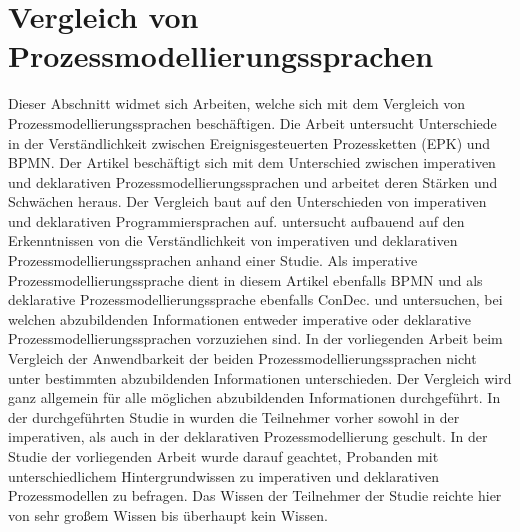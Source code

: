 \section{Vergleich von Prozessmodellierungssprachen}

Dieser Abschnitt widmet sich Arbeiten, welche sich mit dem Vergleich von Prozessmodellierungssprachen beschäftigen.\newline
Die Arbeit \cite{recker2007does} untersucht Unterschiede in der Verständlichkeit zwischen Ereignisgesteuerten Prozessketten (EPK) und BPMN.\newline
Der Artikel \cite{fahland2010} beschäftigt sich mit dem Unterschied zwischen imperativen und deklarativen Prozessmodellierungssprachen und arbeitet deren Stärken und Schwächen heraus. Der Vergleich baut auf den Unterschieden von imperativen und deklarativen Programmiersprachen auf. \newline
\cite{pichler2012} untersucht aufbauend auf den Erkenntnissen von  \cite{fahland2010} die Verständlichkeit von imperativen und deklarativen Prozessmodellierungssprachen anhand einer Studie. Als imperative Prozessmodellierungssprache dient in diesem Artikel ebenfalls BPMN und als deklarative Prozessmodellierungssprache ebenfalls ConDec. \newline 
\cite{fahland2010} und \cite{pichler2012} untersuchen, bei welchen abzubildenden Informationen entweder imperative oder deklarative Prozessmodellierungssprachen vorzuziehen sind. In der vorliegenden Arbeit beim Vergleich der Anwendbarkeit der beiden Prozessmodellierungssprachen nicht unter bestimmten abzubildenden Informationen unterschieden. Der Vergleich wird ganz allgemein für alle möglichen abzubildenden Informationen durchgeführt. \newline
In der durchgeführten Studie in \cite{pichler2012} wurden die Teilnehmer vorher sowohl in der imperativen, als auch in der deklarativen Prozessmodellierung geschult. In der Studie der vorliegenden Arbeit wurde darauf geachtet, Probanden mit unterschiedlichem Hintergrundwissen zu imperativen und deklarativen Prozessmodellen zu befragen. Das Wissen der Teilnehmer der Studie reichte hier von sehr großem Wissen bis überhaupt kein Wissen.\newline


